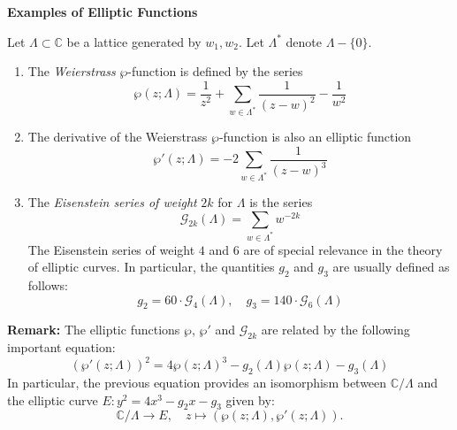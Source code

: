 \documentclass[12pt]{article}
\newcommand{\Complex}{\mathbb{C}}
\begin{document}
{\bf Examples of Elliptic Functions}

Let $\Lambda \subset \Complex$ be a lattice generated by
$w_1,w_2$. Let $\Lambda^{\ast}$ denote $\Lambda-\{ 0 \}$.
\begin{enumerate}
\item The \emph{Weierstrass} $\wp$-function is defined by the
series
$$\wp(z;\Lambda)=\frac{1}{z^2}+\sum_{w\in\Lambda^{\ast}}\frac{1}{(z-w)^2}-\frac{1}{w^2}$$

\item The derivative of the Weierstrass $\wp$-function is also an
elliptic function
$$\wp'(z;\Lambda)=-2\sum_{w\in\Lambda^{\ast}}\frac{1}{(z-w)^3}$$

\item The \emph{Eisenstein series of weight} $2k$ for $\Lambda$ is
the series
$$\mathcal{G}_{2k}(\Lambda)=\sum_{w\in\Lambda^{\ast}}w^{-2k}$$
The Eisenstein series of weight $4$ and $6$ are of special
relevance in the theory of elliptic curves. In particular, the quantities $g_2$ and $g_3$ are usually defined as follows:
$$g_2=60\cdot\mathcal{G}_4(\Lambda),\quad
g_3=140\cdot\mathcal{G}_6(\Lambda)$$
\end{enumerate}

{\bf Remark:} The elliptic functions $\wp$, $\wp'$ and $\mathcal{G}_{2k}$ are related by the following important equation: 
\[\left( \wp'(z;\Lambda) \right)^2 = 4 \wp(z;\Lambda)^3 -
g_2(\Lambda) \wp(z;\Lambda) - g_3(\Lambda)\]
In particular, the previous equation provides an isomorphism between $\Complex/\Lambda$ and the elliptic curve $E : y^2=4x^3-g_2x-g_3$ given by:
$$\Complex/\Lambda \to  E, \quad z \mapsto (\wp(z;\Lambda),\wp'(z;\Lambda)).$$
\end{document}
